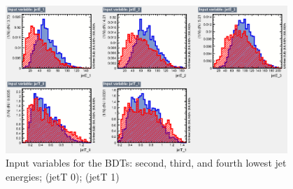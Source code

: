 \begin{figure}[h]
	\centering
	\includegraphics[width=0.95\textwidth]{../Pictures/Analysis/BDTs/variables_id_c5.eps}
	\caption{Input variables for the BDTs: second, third, and fourth lowest jet energies; (jetT 0); (jetT 1)}
	\label{figure:analysis/results/tmva-inputs-5}
\end{figure}

